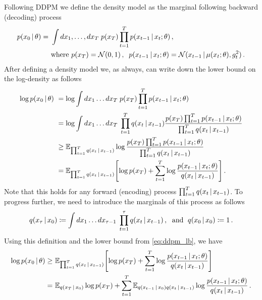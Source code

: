 Following DDPM \citep{sohl2015deep, ho2020denoising} we define the density model as the marginal following backward (decoding) process
\begin{align}
\begin{split}
    \label{eq:backward_process}
    p(x_0\,|\, \theta) =~& \int dx_1,\ldots,dx_T\; p(x_T)\prod_{t=1}^Tp(x_{t-1}\,|\, x_t; \theta)\,, \\
    ~&\text{where } p(x_T) = \mathcal{N}(0,1)\,,\;\; p(x_{t-1}\,|\, x_t;\theta) = \mathcal{N}(x_{t-1}\,|\, \mu(x_t;\theta), g_t^2)\,.
\end{split}
\end{align}
After defining a density model we, as always, can write down the lower bound on the log-density as follows
\begin{align}
    \log p(x_0\cond \theta) ~&= \log \int dx_1\ldots dx_T\; p(x_T)\prod_{t=1}^{T} p(x_{t-1}\cond x_t;\theta) \\
    ~&= \log \int dx_1\ldots dx_T\; \prod_{t=1}^{T} q(x_{t}\cond x_{t-1})\frac{p(x_T)\prod_{t=1}^{T} p(x_{t-1}\cond x_t;\theta)}{\prod_{t=1}^{T} q(x_{t}\cond x_{t-1})}\\
    ~&\geq \mean_{\prod_{t=1}^{T} q(x_{t}\cond x_{t-1})} \log \frac{p(x_T)\prod_{t=1}^{T} p(x_{t-1}\cond x_t;\theta)}{\prod_{t=1}^{T} q(x_{t}\cond x_{t-1})} \\
    ~&= \mean_{\prod_{t=1}^{T} q(x_{t}\cond x_{t-1})}\left[ \log p(x_T) + \sum_{t=1}^{T} \log \frac{p(x_{t-1}\cond x_t;\theta)}{q(x_{t}\cond x_{t-1})}\right]\,.\label{eq:ddpm_lb}
\end{align}
Note that this holds for any forward (encoding) process $\prod_{t=1}^{T} q(x_{t}\,|\, x_{t-1})$. To progress further, we need to introduce the marginals of this process as follows
\begin{align}
    q(x_\tau \,|\, x_0)\coloneqq \int dx_{1}\ldots dx_{\tau-1}\; \prod_{t=1}^{\tau} q(x_{t}\,|\, x_{t-1})\,,\;\text{ and }\; q(x_0\,|\, x_0)\coloneqq 1\,.
\end{align}
Using this definition and the lower bound from \cref{eq:ddpm_lb}, we have
\begin{align}
    \log p(x_0\cond \theta) \geq~& \mean_{\prod_{t=1}^{T} q(x_{t}\cond x_{t-1})}\left[ \log p(x_T) + \sum_{t=1}^{T} \log \frac{p(x_{t-1}\cond x_t;\theta)}{q(x_{t}\cond x_{t-1})}\right]\\
    =~& \mean_{q(x_T\cond x_0)}\log p(x_T) + \sum_{t=1}^{T}\mean_{q(x_{t-1}\cond x_0)q(x_{t}\cond x_{t-1})}\log \frac{p(x_{t-1}\cond x_t;\theta)}{q(x_{t}\cond x_{t-1})}\,.
\end{align}
